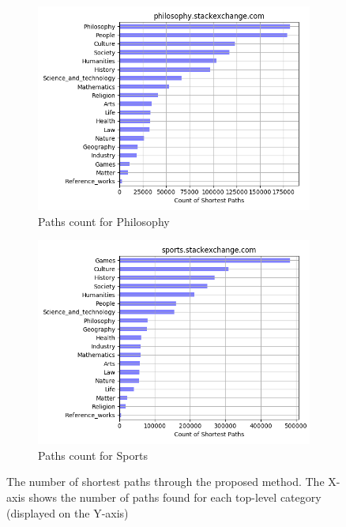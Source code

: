 \begin{figure}[H]
     \begin{subfigure}{0.5\textwidth}
    \centering
        \includegraphics[width=1\linewidth]{imgs/path-counts/philosophy_stackexchange_com}
        \caption{Paths count for Philosophy}
        \label{fig:path-count-philosophy}
    \end{subfigure}%
    \begin{subfigure}{0.5\textwidth}
    \centering
        \includegraphics[width=1\linewidth]{imgs/path-counts/sports_stackexchange_com}
        \caption{Paths count for Sports}
        \label{fig:path-count-sports}
    \end{subfigure}
   
 
    \caption{The number of shortest paths through the proposed method. The X-axis shows the number of paths found for each top-level category (displayed on the Y-axis) }
    \label{fig:complete-path-count-distribution}
    
\end{figure}